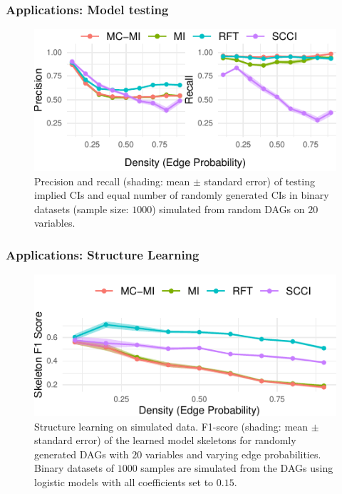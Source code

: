 \documentclass{beamer}
\begin{document}
\begin{frame}
	\frametitle{Applications: Model testing}
	\begin{figure}
		\centering
		\includegraphics{imgs/model_testing.pdf}
		\caption*{Precision and recall (shading: mean $\pm$ standard
		error) of testing implied CIs and equal number of randomly
		generated CIs in binary datasets (sample size: $1000$)
		simulated from random DAGs on $ 20 $ variables.}
	\end{figure}
\end{frame}

\begin{frame}
	\frametitle{Applications: Structure Learning}
	\begin{figure}
		\centering
		\includegraphics{imgs/sl_density.pdf}
		\caption*{Structure learning on simulated data. F1-score
		(shading: mean $\pm$ standard error) of the learned model
		skeletons for randomly generated DAGs with $20$ variables and
		varying edge probabilities.  Binary datasets of $ 1000 $
		samples are simulated from the DAGs using logistic models with
		all coefficients set to $ 0.15$.}
	\end{figure}
\end{frame}
\end{document}
